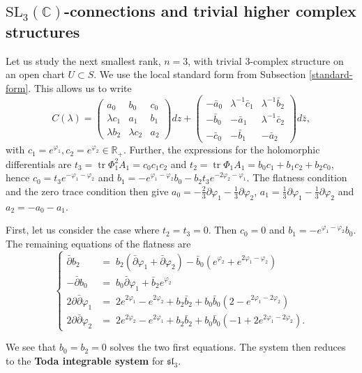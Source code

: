 \documentclass[11pt]{amsart}
\numberwithin{thm}{section} %
\numberwithin{equation}{section} %
\numberwithin{figure}{section} %
\newcommand*{\R}{\mathbb{R}}
\newcommand*{\C}{\mathbb{C}}
\renewcommand*{\S}{S}
\renewcommand*{\l}{\lambda}
\newcommand*{\mf}{\mathfrak}
\DeclareMathOperator{\tr}{tr}
\begin{document}
\subsection{$\mathrm{SL}_3(\C)$-connections and trivial higher complex structures}\label{n2n3}

Let us study the next smallest rank, $n=3$, with trivial $3$-complex structure on an open chart $U\subset \S$. We use the local standard form from Subsection \ref{standard-form}. This allows us to write 
$$C(\l)=\begin{pmatrix} a_0 & b_0 & c_0 \\ \l c_1 & a_1 & b_1 \\ \l b_2 & \l c_2 & a_2 \end{pmatrix}dz+ \begin{pmatrix} -\bar{a}_0 & \l^{-1}\bar{c}_1 & \l^{-1}\bar{b}_2 \\ -\bar{b}_0 & -\bar{a}_1 & \l^{-1}\bar{c}_2 \\ -\bar{c}_0 & -\bar{b}_1 & -\bar{a}_2\end{pmatrix}d\bar{z},$$
with $c_1=e^{\varphi_1}, c_2=e^{\varphi_2} \in \R_+$. Further, the expressions for the holomorphic differentials are $t_3=\tr \Phi_1^2A_1 = c_0c_1c_2$ and $t_2= \tr\Phi_1A_1 = b_0c_1+b_1c_2+b_2c_0$, hence $c_0=t_3e^{-\varphi_1-\varphi_2}$ and $b_1=-e^{\varphi_1-\varphi_2}b_0-b_2t_3e^{-2\varphi_2-\varphi_1}$.
The flatness condition and the zero trace condition then give $a_0=-\frac{2}{3}\partial\varphi_1-\frac{1}{3}\partial\varphi_2$, $a_1=\frac{1}{3}\partial\varphi_1-\frac{1}{3}\partial\varphi_2$ and $a_2=-a_0-a_1$.

\medskip
First, let us consider the case where $t_2=t_3=0$. Then $c_0=0$ and $b_1=-e^{\varphi_1-\varphi_2}b_0$. The remaining equations of the flatness are
$$ \left \{\begin{array}{cl}
\bar{\partial}b_2 &= \; b_2(\bar{\partial}\varphi_1+\bar{\partial}\varphi_2)-\bar{b}_0(e^{\varphi_2}+e^{2\varphi_1-\varphi_2}) \\
-\bar{\partial}b_0 &= \;  b_0\bar{\partial}\varphi_1+\bar{b}_2e^{\varphi_2} \\
2\partial\bar{\partial}\varphi_1 &= \;  2e^{2\varphi_1}-e^{2\varphi_2}+b_2\bar{b}_2+b_0\bar{b}_0(2-e^{2\varphi_1-2\varphi_2}) \\
2\partial\bar{\partial}\varphi_2 &= \;  2e^{2\varphi_2}-e^{2\varphi_1}+b_2\bar{b}_2+b_0\bar{b}_0(-1+2e^{2\varphi_1-2\varphi_2}). 
\end{array}\right. $$

We see that $b_0=b_2=0$ solves the two first equations.
The system then reduces to the \textbf{Toda integrable system} for $\mf{sl}_3$. 
\end{document}
